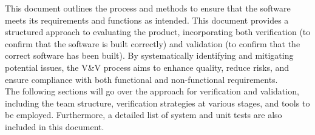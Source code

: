 \documentclass[12pt, titlepage]{article}
\begin{document}

\newpage

\tableofcontents

\listoftables
{}


\newpage







\noindent This document outlines the process and methods to ensure that the
software meets its requirements and functions as intended. This
document provides a structured approach to evaluating the product,
incorporating both verification (to confirm that the software is
built correctly) and validation (to confirm that the correct software
has been built). By systematically identifying and mitigating
potential issues, the V\&V process aims to enhance quality, reduce
risks, and ensure compliance with both functional and non-functional
requirements.\\

\noindent The following sections will go over the approach for verification and
validation, including the team structure, verification strategies at
various stages, and tools to be employed. Furthermore, a detailed list
of system and unit tests are also included in this document.
\end{document}
